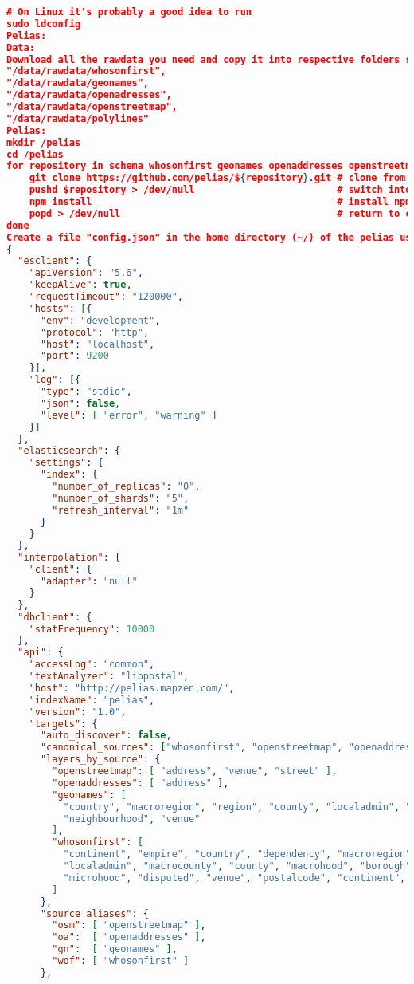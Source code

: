 \begin{lstlisting}[language=json,breaklines=true]
# On Linux it's probably a good idea to run
sudo ldconfig
Pelias: 
Data:
Download all the rawdata you need and copy it into respective folders such as
"/data/rawdata/whosonfirst", 
"/data/rawdata/geonames", 
"/data/rawdata/openadresses", 
"/data/rawdata/openstreetmap", 
"/data/rawdata/polylines"
Pelias:
mkdir /pelias
cd /pelias
for repository in schema whosonfirst geonames openaddresses openstreetmap polylines api placeholder interpolation pip-service; do
	git clone https://github.com/pelias/${repository}.git # clone from Github
	pushd $repository > /dev/null                         # switch into importer directory
	npm install                                           # install npm dependencies
	popd > /dev/null                                      # return to code directory
done
Create a file "config.json" in the home directory (~/) of the pelias user. Paste following into pelias.json:
{
  "esclient": {
    "apiVersion": "5.6",
    "keepAlive": true,
    "requestTimeout": "120000",
    "hosts": [{
      "env": "development",
      "protocol": "http",
      "host": "localhost",
      "port": 9200
    }],
    "log": [{
      "type": "stdio",
      "json": false,
      "level": [ "error", "warning" ]
    }]
  },
  "elasticsearch": {
    "settings": {
      "index": {
        "number_of_replicas": "0",
        "number_of_shards": "5",
        "refresh_interval": "1m"
      }
    }
  },
  "interpolation": {
    "client": {
      "adapter": "null"
    }
  },
  "dbclient": {
    "statFrequency": 10000
  },
  "api": {
    "accessLog": "common",
    "textAnalyzer": "libpostal",
    "host": "http://pelias.mapzen.com/",
    "indexName": "pelias",
    "version": "1.0",
    "targets": {
      "auto_discover": false,
      "canonical_sources": ["whosonfirst", "openstreetmap", "openaddresses", "geonames"],
      "layers_by_source": {
        "openstreetmap": [ "address", "venue", "street" ],
        "openaddresses": [ "address" ],
        "geonames": [
          "country", "macroregion", "region", "county", "localadmin", "locality", "borough",
          "neighbourhood", "venue"
        ],
        "whosonfirst": [
          "continent", "empire", "country", "dependency", "macroregion", "region", "locality",
          "localadmin", "macrocounty", "county", "macrohood", "borough", "neighbourhood",
          "microhood", "disputed", "venue", "postalcode", "continent", "ocean", "marinearea"
        ]
      },
      "source_aliases": {
        "osm": [ "openstreetmap" ],
        "oa":  [ "openaddresses" ],
        "gn":  [ "geonames" ],
        "wof": [ "whosonfirst" ]
      },

\end{lstlisting}
